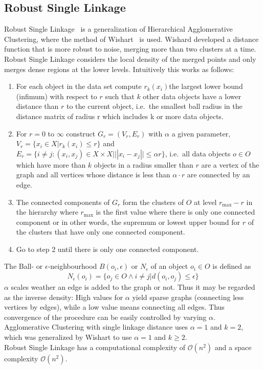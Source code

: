 \subsection{Robust Single Linkage}\label{\positionnumber}
Robust Single Linkage~\cite{Chaudhuri2010RatesOC} is a generalization of Hierarchical Agglomerative Clustering, where the method of Wishart~\cite{wishart1969256} is used. Wishard developed a distance function that is more robust to noise, merging more than two clusters at a time. Robust Single Linkage considers the local density of the merged points and only merges dense regions at the lower levels. Intuitively this works as follows:
\begin{enumerate}
    \item For each object in the data set compute $r_k(x_i) $the largest lower bound (infimum) with respect to $r$ such that $k$ other data objects have a lower distance than $r$ to the current object, i.e.~the smallest ball radius in the distance matrix of radius r which includes k or more data objects.
    \item For $r=0$ to $\infty$ construct $G_r = (V_r, E_r)$ with $\alpha$ a given parameter, $V_r = \{x_i \in X | r_k(x_i) \leq r\}$ and $E_r = \{i \neq j: (x_i, x_j) \in X \times X | ||x_i - x_j|| \leq \alpha r\}$, i.e.~all data objects $o \in O$ which have more than $k$ objects in a radius smaller than $r$ are a vertex of the graph and all vertices whose distance is less than $\alpha \cdot r$ are connected by an edge. 
    \item The connected components of $G_r$ form the clusters of $O$ at level $r_{\text{max}} - r$ in the hierarchy where $r_{\text{max}}$ is the first value where there is only one connected component or in other words, the supremum or lowest upper bound for $r$ of the clusters that have only one connected component.
    \item Go to step 2 until there is only one connected component.
\end{enumerate}
 The Ball- or $\epsilon$-neighbourhood $B(o_i, \epsilon)$ or $N_\epsilon$ of an object $o_i \in O$ is defined as \[N_\epsilon(o_i) = \{o_j \in O \wedge i \neq j | d(o_i, o_j) \leq \epsilon \}\]
$\alpha$ scales weather an edge is added to the graph or not. Thus it may be regarded as the inverse density: High values for $\alpha$ yield sparse graphs (connecting less vertices by edges), while a low value means connecting all edges. Thus convergence of the procedure can be easily controlled by varying $\alpha$. \\
Agglomerative Clustering with single linkage distance uses $\alpha = 1$ and $k = 2$, which was generalized by Wishart to use $\alpha = 1$ and $k \geq 2$. \\
Robust Single Linkage has a computational complexity of $\mathcal{O}(n^2)$ and a space complexity $\mathcal{O}(n^2)$. \\


